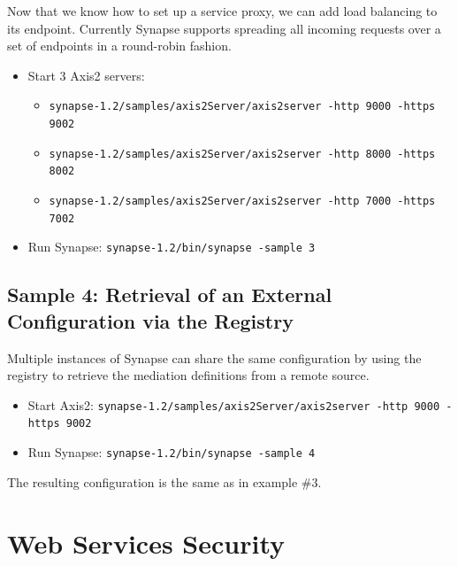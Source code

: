 Now that we know how to set up a service proxy, we can add load balancing to
its endpoint. Currently Synapse supports spreading all incoming requests over a
set of endpoints in a round-robin fashion.

\begin{itemize}
  \item Start 3 Axis2 servers:
  \begin{itemize}
    \item \texttt{synapse-1.2/samples/axis2Server/axis2server -http 9000 -https 9002}
    \item \texttt{synapse-1.2/samples/axis2Server/axis2server -http 8000 -https
    8002}
    \item \texttt{synapse-1.2/samples/axis2Server/axis2server -http 7000 -https
    7002}
  \end{itemize}
  \item Run Synapse: \texttt{synapse-1.2/bin/synapse -sample 3}
\end{itemize}

\lstset{caption=, label=sample-3-xml}



\subsection{Sample 4: Retrieval of an External Configuration via the Registry}
\label{sec:sample-4}

Multiple instances of Synapse can share the same configuration by using
the registry to retrieve the mediation definitions from a remote source.

\begin{itemize}
  \item Start Axis2: \texttt{synapse-1.2/samples/axis2Server/axis2server -http
  9000 -https 9002}
  \item Run Synapse: \texttt{synapse-1.2/bin/synapse -sample 4}
\end{itemize}

\lstset{caption=, label=sample-4-xml}


The resulting configuration is the same as in example \#3.

\newpage
\section{Web Services Security}
\label{chap:web-services-security}

